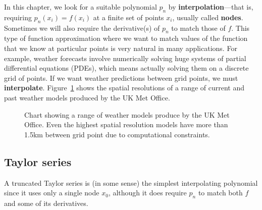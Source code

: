 \documentclass[
  letterpaper,
  DIV=11,
  numbers=noendperiod]{scrreprt}
\begin{document}
In this chapter, we look for a suitable polynomial \(p_n\) by
\textbf{interpolation}---that is, requiring \(p_n(x_i) = f(x_i)\) at a
finite set of points \(x_i\), usually called \textbf{nodes}. Sometimes
we will also require the derivative(s) of \(p_n\) to match those of
\(f\). This type of function approximation where we want to match values
of the function that we know at particular points is very natural in
many applications. For example, weather forecasts involve numerically
solving huge systems of partial differential equations (PDEs), which
means actually solving them on a discrete grid of points. If we want
weather predictions between grid points, we must \textbf{interpolate}.
Figure~\ref{fig-MET} shows the spatial resolutions of a range of current
and past weather models produced by the UK Met Office.

\begin{figure}


\caption{\label{fig-MET}Chart showing a range of weather models produce
by the UK Met Office. Even the highest spatial resolution models have
more than 1.5km between grid point due to computational constraints.}

\end{figure}%

\subsection{Taylor series}\label{taylor-series}

A truncated Taylor series is (in some sense) the simplest interpolating
polynomial since it uses only a single node \(x_0\), although it does
require \(p_n\) to match both \(f\) and some of its derivatives.
\end{document}
